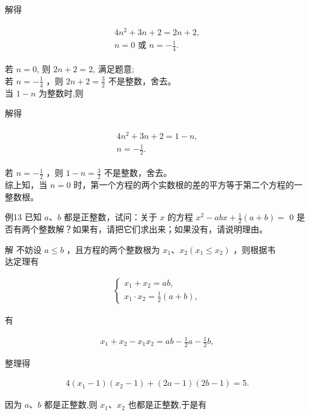 \documentclass[10pt]{article}
\begin{document}
解得

\begin{align*}
\begin{gathered}
4 n^{2}+3 n+2=2 n+2, \\
n=0 \text { 或 } n=-\frac{1}{4} .
\end{gathered}
\end{align*}

若 $n=0$, 则 $2 n+2=2$, 满足题意;\\
若 $n=-\frac{1}{4}$ ，则 $2 n+2=\frac{3}{2}$ 不是整数，舍去。\\
当 $1-n$ 为整数时,则

解得

\begin{align*}
\begin{gathered}
4 n^{2}+3 n+2=1-n, \\
n=-\frac{1}{2} .
\end{gathered}
\end{align*}

若 $n=-\frac{1}{2}$ ，则 $1-n=\frac{3}{2}$ 不是整数，舍去。\\
综上知，当 $n=0$ 时，第一个方程的两个实数根的差的平方等于第二个方程的一整数根。

例13 已知 $a 、 b$ 都是正整数，试问：关于 $x$ 的方程 $x^{2}-a b x+\frac{1}{2}(a+b)=$ 0 是否有两个整数解？如果有，请把它们求出来；如果没有，请说明理由。

解 不妨设 $a \leqslant b$ ，且方程的两个整数根为 $x_{1} 、 x_{2}\left(x_{1} \leqslant x_{2}\right)$ ，则根据韦\\
达定理有

\begin{align*}
\left\{\begin{array}{l}
x_{1}+x_{2}=a b, \\
x_{1} \cdot x_{2}=\frac{1}{2}(a+b),
\end{array}\right.
\end{align*}

有

\begin{align*}
x_{1}+x_{2}-x_{1} x_{2}=a b-\frac{1}{2} a-\frac{1}{2} b,
\end{align*}

整理得

\begin{align*}
4\left(x_{1}-1\right)\left(x_{2}-1\right)+(2 a-1)(2 b-1)=5 .
\end{align*}

因为 $a 、 b$ 都是正整数,则 $x_{1} 、 x_{2}$ 也都是正整数,于是有
\end{document}
